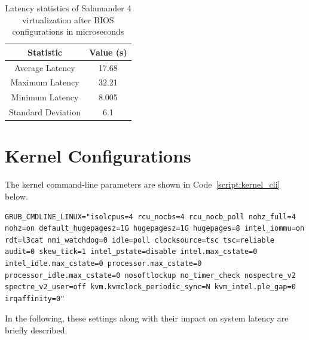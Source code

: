 \documentclass[MMR,Master,english]{twbook}
\begin{document}
\begin{table}[H]
	\centering
	\caption[Latency statistics of Salamander 4 after BIOS configurations]{Latency statistics of Salamander 4 virtualization after BIOS configurations in microseconds}
	\label{tab:latency_statistics_virt}
	\setlength{\tabcolsep}{0.5em} %
	{\renewcommand{\arraystretch}{1.2}%
	\begin{tabular}{|c|c|}\hline
	\textbf{Statistic} & \textbf{Value (\textmu s)} \\\hline
	Average Latency & 17.68 \\\hline
	Maximum Latency & 32.21 \\\hline
	Minimum Latency & 8.005 \\\hline
	Standard Deviation & 6.1 \\\hline
	\end{tabular}}
	\end{table}

\section{Kernel Configurations}\label{sec:kernel_configurations}

The kernel command-line parameters are shown in Code~\ref{script:kernel_cli} below. 

\vspace{1em}
\begin{minipage}{0.95\columnwidth}
	\begin{lstlisting}[name={Kernel Configuration},label={script:kernel_cli}]
		GRUB_CMDLINE_LINUX="isolcpus=4 rcu_nocbs=4 rcu_nocb_poll nohz_full=4 nohz=on default_hugepagesz=1G hugepagesz=1G hugepages=8 intel_iommu=on rdt=l3cat nmi_watchdog=0 idle=poll clocksource=tsc tsc=reliable audit=0 skew_tick=1 intel_pstate=disable intel.max_cstate=0 intel_idle.max_cstate=0 processor.max_cstate=0 processor_idle.max_cstate=0 nosoftlockup no_timer_check nospectre_v2 spectre_v2_user=off kvm.kvmclock_periodic_sync=N kvm_intel.ple_gap=0 irqaffinity=0"
\end{lstlisting}
\end{minipage}

\noindent In the following, these settings along with their impact on system latency are briefly described. 
\end{document}
